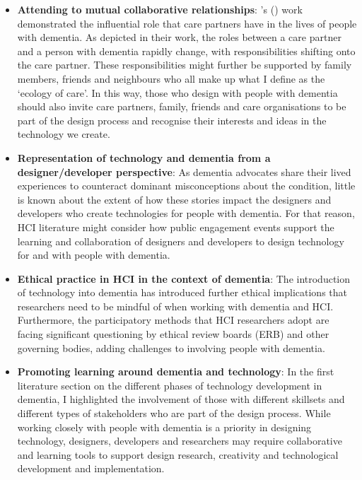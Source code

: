 \begin{itemize}

     \item \textbf{Attending to mutual collaborative relationships}: \citeauthor{ryan_dementia_2009}'s (\citeyear{ryan_dementia_2009}) work demonstrated the influential role that care partners have in the lives of people with dementia. As depicted in their work, the roles between a care partner and a person with dementia rapidly change, with responsibilities shifting onto the care partner. These responsibilities might further be supported by family members, friends and neighbours who all make up what I define as the `ecology of care'. In this way, those who design with people with dementia should also invite care partners, family, friends and care organisations to be part of the design process and recognise their interests and ideas in the technology we create.

    \item \textbf{Representation of technology and dementia from a designer/developer perspective}: As dementia advocates share their lived experiences to counteract dominant misconceptions about the condition, little is known about the extent of how these stories impact the designers and developers who create technologies for people with dementia. For that reason, HCI literature might consider how public engagement events support the learning and collaboration of designers and developers to design technology for and with people with dementia.

    \item \textbf{Ethical practice in HCI in the context of dementia}: The introduction of technology into dementia has introduced further ethical implications that researchers need to be mindful of when working with dementia and HCI. Furthermore, the participatory methods that HCI researchers adopt are facing significant questioning by ethical review boards (ERB) and other governing bodies, adding challenges to involving people with dementia.

    \item \textbf{Promoting learning around dementia and technology}: In the first literature section on the different phases of technology development in dementia, I highlighted the involvement of those with different skillsets and different types of stakeholders who are part of the design process. While working closely with people with dementia is a priority in designing technology, designers, developers and researchers may require collaborative and learning tools to support design research, creativity and technological development and implementation.  
\end{itemize}

